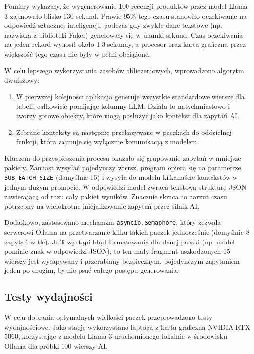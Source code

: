 Pomiary wykazały, że wygenerowanie 100 recenzji produktów przez model Llama 3 zajmowało blisko 130 sekund. Prawie 95\% tego czasu stanowiło oczekiwanie na odpowiedź sztucznej inteligencji, podczas gdy zwykłe dane tekstowe (np. nazwiska z biblioteki Faker) generowały się w ułamki sekund. Czas oczekiwania na jeden rekord wynosił około 1.3 sekundy, a procesor oraz karta graficzna przez większość tego czasu nie były w pełni obciążone.

W celu lepszego wykorzystania zasobów obliczeniowych, wprowadzono algorytm dwufazowy:

\begin{enumerate}
    \item W pierwszej kolejności aplikacja generuje wszystkie standardowe wiersze dla tabeli, całkowicie pomijając kolumny LLM. Działa to natychmiastowo i tworzy gotowe obiekty, które mogą posłużyć jako kontekst dla zapytań AI.
    \item Zebrane konteksty są następnie przekazywane w paczkach do oddzielnej funkcji, która zajmuje się wyłącznie komunikacją z modelem.
\end{enumerate}

Kluczem do przyspieszenia procesu okazało się grupowanie zapytań w mniejsze pakiety. Zamiast wysyłać pojedynczy wiersz, program opiera się na parametrze \texttt{SUB\_BATCH\_SIZE} (domyślnie 15) i wysyła do modelu kilkanaście kontekstów w jednym dużym prompcie. W odpowiedzi model zwraca tekstową strukturę \gls{JSON} zawierającą od razu cały pakiet wyników. Znacznie skraca to narzut czasu potrzebny na wielokrotne inicjalizowanie zapytań przez silnik AI.

Dodatkowo, zastosowano mechanizm \texttt{asyncio.Semaphore}, który zezwala serwerowi Ollama na przetwarzanie kilku takich paczek jednocześnie (domyślnie 8 zapytań w tle). Jeśli wystąpi błąd formatowania dla danej paczki (np. model pominie znak w odpowiedzi \gls{JSON}), to ten mały fragment uszkodzonych 15 wierszy jest wyłapywany i przerabiany bezpiecznym, pojedynczym zapytaniem jeden po drugim, by nie psuć całego postępu generowania.

\subsection*{Testy wydajności}
W celu dobrania optymalnych wielkości paczek przeprowadzono testy wydajnościowe. Jako stację wykorzystano laptopa z kartą graficzną NVIDIA RTX 5060, korzystając z modelu Llama 3 uruchomionego lokalnie w środowisku Ollama dla próbki 100 wierszy AI.

